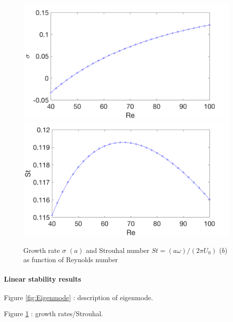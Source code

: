 \documentclass[twocolumn,10pt]{asme2ej}
\begin{document}
\begin{figure}
\includegraphics[width=.9 \linewidth]{Cylinder_Sigma_Re.png}
\includegraphics[width=.9 \linewidth]{Cylinder_Strouhal_Re.png}
\caption{Growth rate $\sigma$ $(a)$  and Strouhal number $St = (a \omega)/(2\pi U_0)$ ($b$) as function of Reynolds number}
\label{fig:SigmaOmega}
\end{figure}


\paragraph{Linear stability results}

Figure \ref{fig:Eigenmode} : description of eigenmode.

Figure \ref{fig:SigmaOmega} : growth rates/Strouhal.
\end{document}

